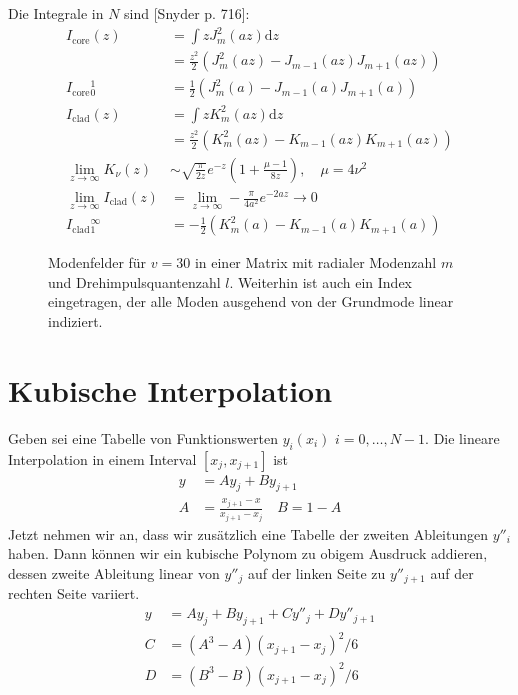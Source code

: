\documentclass[DIV19,twocolumn]{scrartcl}
\def\({\left(}
\def\){\right)}
\def\svgending{\ifx\pdfoutput\undefined%
  .eps_tex%
  \else%
  .pdf_tex%
  \fi}
\newcommand{\svginput}[2]{{\def\svgscale{#1}}}
\begin{document}
Die Integrale in $N$ sind [Snyder p. 716]: 
\begin{align}
  I_\textrm{core}(z) &= \int z J_m^2(az) \textrm{d} z \\&= \frac{z^2}{2}(J_m^2(az)-J_{m-1}(az)J_{m+1}(az))\\
  I_\textrm{core} {}^1_0 &= \frac{1}{2}(J_m^2(a)-J_{m-1}(a)J_{m+1}(a)) \\
  I_\textrm{clad}(z) &= \int z K_m^2(az) \textrm{d} z \\&= \frac{z^2}{2}(K_m^2(az)-K_{m-1}(az)K_{m+1}(az)) \\
  \lim_{z\rightarrow \infty} K_\nu(z) &\sim \sqrt{\frac{\pi}{2z}} e^{-z}\(1+\frac{\mu-1}{8z}\), \quad \mu=4\nu^2 \\ %
  \lim_{z\rightarrow \infty} I_\textrm{clad}(z)  & = \lim_{z\rightarrow \infty} -\frac{\pi}{4a^2}e^{-2az} \rightarrow 0 \\
  I_\textrm{clad} {}^\infty_1 &= -\frac{1}{2}(K_m^2(a)-K_{m-1}(a)K_{m+1}(a)) 
\end{align}


\begin{figure}[hbtp]
  \centering
  \svginput{1}{modes}
  \caption{Modenfelder f\"ur $v=30$ in einer Matrix mit radialer
    Modenzahl $m$ und Drehimpulsquantenzahl $l$. Weiterhin ist auch
    ein Index eingetragen, der alle Moden ausgehend von der Grundmode
    linear indiziert.}
  \label{fig:fields}
\end{figure}
\section{Kubische Interpolation}
Geben sei eine Tabelle von Funktionswerten $y_i(x_i)$
$i=0,\ldots,N-1$. Die lineare Interpolation in einem Interval
$[x_j,x_{j+1}]$ ist
\begin{align}
  y &= Ay_j + By_{j+1} \\
  A &= \frac{x_{j+1}-x}{x_{j+1}-x_j}\quad B=1-A
\end{align}
Jetzt nehmen wir an, dass wir zus\"atzlich eine Tabelle der zweiten
Ableitungen $y''_i$ haben. Dann k\"onnen wir ein kubische Polynom zu
obigem Ausdruck addieren, dessen zweite Ableitung linear von $y''_j$
auf der linken Seite zu $y''_{j+1}$ auf der rechten Seite variiert.
\begin{align}
  y &= Ay_j + By_{j+1} + Cy''_j + Dy''_{j+1} \\
  C &= (A^3-A)(x_{j+1}-x_j)^2/6 \\
  D &= (B^3-B)(x_{j+1}-x_j)^2/6 
\end{align}
\end{document}
